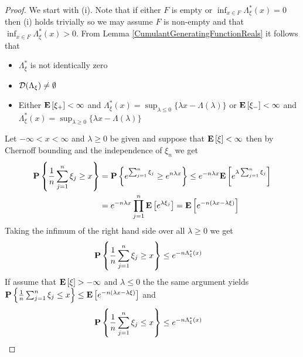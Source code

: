 \begin{proof}
We start with (i).  Note that if either $F$ is empty or $\inf_{x \in F} \Lambda_\xi^*(x) = 0$ then (i) holds trivially so we may assume $F$ is non-empty and that $\inf_{x\in F} \Lambda_\xi^*(x) > 0$.  From Lemma \ref{CumulantGeneratingFunctionReals} it follows that 
\begin{itemize}
\item $\Lambda_\xi^*$ is not identically zero 
\item $\mathcal{D}(\Lambda_\xi) \neq \emptyset$
\item Either $\textbf{E}\left[\xi_+\right] <\infty$ and $\Lambda_\xi^*(x) = \sup_{\lambda \leq 0} \lbrace \lambda x - \Lambda(\lambda) \rbrace$ or $\textbf{E}\left[\xi_-\right] <\infty$ and 
$\Lambda_\xi^*(x) = \sup_{\lambda \geq 0} \lbrace \lambda x - \Lambda(\lambda) \rbrace$
\end{itemize}
Let $-\infty < x < \infty$ and $\lambda \geq 0$ be given and suppose that $\textbf{E}\left[\xi\right] < \infty$ then by Chernoff bounding and the independence of $\xi_n$ we get
\begin{align*}
\textbf{P}\left \{\frac{1}{n} \sum_{j=1}^n \xi_j \geq x \right \} &= \textbf{P}\left \{e^{ \sum_{j=1}^n \xi_j} \geq e^{n\lambda x} \right \} \leq e^{-n\lambda x} \textbf{E}\left[e^{ \lambda \sum_{j=1}^n \xi_j}\right] \\
&=e^{-n\lambda x}  \prod_{j=1}^n\textbf{E}\left[e^{ \lambda \xi_j}\right] = \textbf{E}\left[e^{-n(\lambda x - \lambda \xi)}\right] 
\end{align*}
Taking the infimum of the right hand side over all $\lambda \geq 0$ we get
\begin{align*}
\textbf{P}\left \{\frac{1}{n} \sum_{j=1}^n \xi_j \geq x \right \} &\leq e^{-n \Lambda_\xi^*(x)}
\end{align*}
If assume that $\textbf{E}\left[\xi\right] > -\infty$ and $\lambda \leq 0$ the the same argument yields $\textbf{P}\left \{\frac{1}{n} \sum_{j=1}^n \xi_j \leq x \right \} \leq \textbf{E}\left[e^{-n(\lambda x - \lambda \xi)}\right]$ and
\begin{align*}
\textbf{P}\left \{\frac{1}{n} \sum_{j=1}^n \xi_j \leq x \right \} &\leq e^{-n \Lambda_\xi^*(x)}
\end{align*}


\end{proof}

